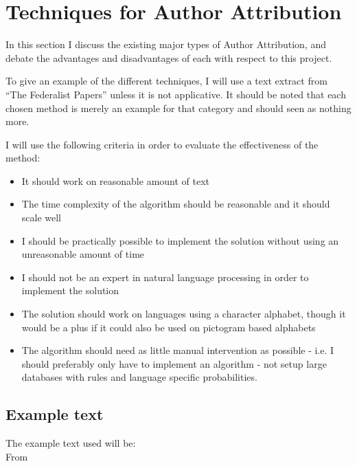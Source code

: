 \section{Techniques for Author Attribution}
\label{choiceMethod}
In this section I discuss the existing major types of Author Attribution, and debate the advantages and disadvantages of each with respect to this project.

To give an example of the different techniques, I will use a text extract from ``The Federalist Papers'' \cite{federalist} unless it is not applicative. It should be noted that each chosen method is merely an example for that category and should seen as nothing more.

I will use the following criteria in order to evaluate the effectiveness of the method:
\begin{itemize}
\item It should work on reasonable amount of text
\item The time complexity of the algorithm should be reasonable and it should scale well
\item I should be practically possible to implement the solution without using an unreasonable amount of time
\item I should not be an expert in natural language processing in order to implement the solution
\item The solution should work on languages using a character alphabet, though it would be a plus if it could also be used on pictogram based alphabets
\item The algorithm should need as little manual intervention as possible - i.e. I should preferably only have to implement an algorithm - not setup large databases with rules and language specific probabilities.  
\end{itemize}

\subsection*{Example text}
The example text used will be:\\
From \cite{federalist}

